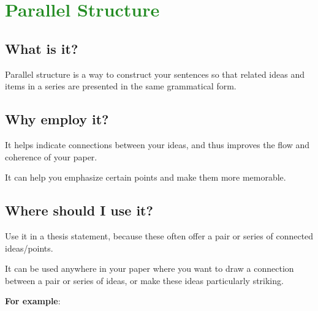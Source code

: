 \documentclass[12pt, hidelinks]{article} %
\begin{document}

\section{\textcolor{ForestGreen}{Parallel Structure}}

\subsection{What is it?}

Parallel structure is a way to construct your sentences so that related ideas and items in a series are presented in the same grammatical form.

\subsection{Why employ it?}

It helps indicate connections between your ideas, and thus improves the flow and coherence of your paper.

It can help you emphasize certain points and make them more memorable.

\subsection{Where should I use it?}

Use it in a thesis statement, because these often offer a pair or series of connected ideas/points.

It can be used anywhere in your paper where you want to draw a connection between a pair or series of ideas, or make these ideas particularly striking.

\textbf{For example}:
\end{document}
